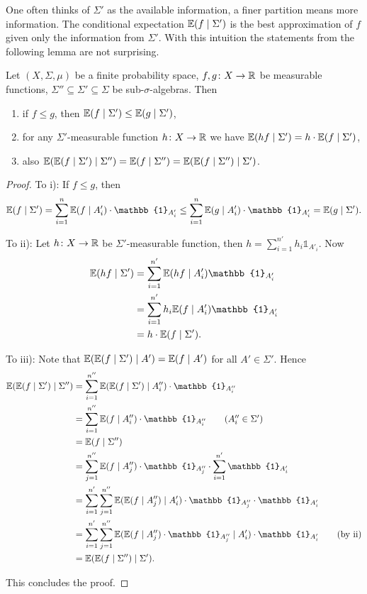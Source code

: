 One often thinks of $\Sigma'$ as the available information, a finer partition means more information. The conditional expectation $\mathbb{E}(f\mid \Sigma')$ is the best approximation of $f$ given only the information from $\Sigma'$. 
With this intuition the statements from the following lemma are not surprising. 
\begin{lemma}\label{lem:condExp}
Let $(X,\Sigma,\mu)$ be a finite probability space, $f,g\colon X\to \mathbb{R}$ be measurable functions, $\Sigma''\subseteq\Sigma'\subseteq\Sigma$ be sub-$\sigma$-algebras. Then
\begin{enumerate}[label=\roman*)]
\item if $f\leq g$, then $\mathbb{E}(f\mid \Sigma')\leq\mathbb{E}(g\mid \Sigma')$,
\item for any $\Sigma'$-measurable function $h\colon X\to\mathbb{R}$ we have $\mathbb{E}(h f\mid\Sigma')=h\cdot\mathbb{E}(f\mid\Sigma')$,
\item also $\mathbb{E}(\mathbb{E}(f\mid \Sigma')\mid\Sigma'')=\mathbb{E}(f\mid\Sigma'')=\mathbb{E}(\mathbb{E}(f\mid \Sigma'')\mid\Sigma')$.
\end{enumerate}
\end{lemma}
\begin{proof}
To i): If $f\leq g$, then
\[\E(f\mid \Sigma')=\sum_{i=1}^n\E(f\mid A'_i)\cdot \mathbb{1}_{A'_i}\leq \sum_{i=1}^n\E(g\mid A'_i)\cdot \mathbb{1}_{A'_i}=\E(g\mid \Sigma').\]


To ii): Let $h\colon X\to\mathbb{R}$ be $\Sigma'$-measurable function, then $h=\sum_{i=1}^{n'}h_i\mathbb{1}_{A'_i}$. Now 
\begin{align*}
\E(h f\mid\Sigma')&=\sum_{i=1}^{n'}\E(hf\mid A'_i)\mathbb{1}_{A'_i}\\
&=\sum_{i=1}^{n'}h_i\E(f\mid A'_i)\mathbb{1}_{A'_i}\\
&=h\cdot\E(f\mid\Sigma').
\end{align*}

To iii): Note that $\mathbb{E}(\mathbb{E}(f\mid \Sigma')\mid A')=\mathbb{E}(f\mid A')$ for all $A'\in\Sigma'$. Hence
\begin{align*}
\E(\E(f\mid \Sigma')\mid\Sigma'')&=\sum_{i=1}^{n''}\E(\E(f\mid \Sigma')\mid A''_i)\cdot\mathbb{1}_{A''_i}\\
&=\sum_{i=1}^{n''}\E(f\mid A''_i)\cdot\mathbb{1}_{A''_i}\tag{$A''_i\in\Sigma'$}\\
&=\E(f\mid\Sigma'')\\
&=\sum_{j=1}^{n''}\E(f\mid A''_j)\cdot\mathbb{1}_{A''_j}\cdot\sum_{i=1}^{n'}\mathbb{1}_{A'_i}\\
&=\sum_{i=1}^{n'}\sum_{j=1}^{n''}\E(\E(f\mid A''_j)\mid A'_i)\cdot\mathbb{1}_{A''_j}\cdot\mathbb{1}_{A'_i}\\
&=\sum_{i=1}^{n'}\sum_{j=1}^{n''}\E(\E(f\mid A''_j)\cdot\mathbb{1}_{A''_j}\mid A'_i)\cdot\mathbb{1}_{A'_i}\tag{by ii}\\
&=\E(\E(f\mid \Sigma'')\mid\Sigma').
\end{align*}


This concludes the proof.
\end{proof}


